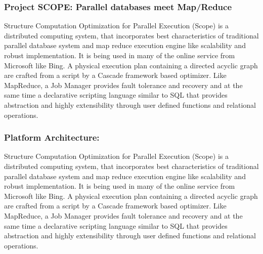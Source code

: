 \documentclass[runningheads,a4paper]{llncs}
\begin{document}
{\subsubsection{Project SCOPE: Parallel databases meet Map/Reduce}
Structure Computation Optimization for Parallel Execution (Scope) is a distributed computing system, that incorporates best characteristics of traditional parallel database system and map reduce execution engine like scalability and robust implementation. It is being used in many of the online service from Microsoft like Bing. A physical execution plan containing a directed acyclic graph are crafted from a script by a Cascade framework based optimizer.  Like MapReduce, a Job Manager provides fault tolerance and recovery and at the same time a declarative scripting language similar to SQL that provides abstraction and highly extensibility through user defined functions and relational operations.\\

\subsubsection{Platform Architecture:}Structure Computation Optimization for Parallel Execution (Scope) is a distributed computing system, that incorporates best characteristics of traditional parallel database system and map reduce execution engine like scalability and robust implementation. It is being used in many of the online service from Microsoft like Bing. A physical execution plan containing a directed acyclic graph are crafted from a script by a Cascade framework based optimizer.  Like MapReduce, a Job Manager provides fault tolerance and recovery and at the same time a declarative scripting language similar to SQL that provides abstraction and highly extensibility through user defined functions and relational operations. 

}
\end{document}

